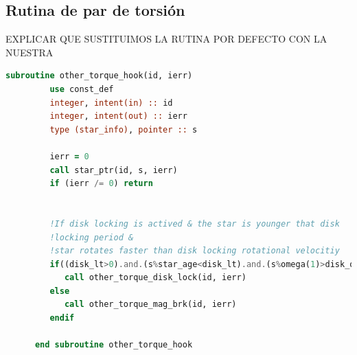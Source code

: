 \subsection{Rutina de par de torsión}
EXPLICAR QUE SUSTITUIMOS LA RUTINA POR DEFECTO CON LA NUESTRA
\begin{lstlisting}[language=Fortran, caption={Rutina de par de torsión.}, label={lst:torque_hook}]
      subroutine other_torque_hook(id, ierr)
         use const_def
         integer, intent(in) :: id
         integer, intent(out) :: ierr
         type (star_info), pointer :: s

         ierr = 0
         call star_ptr(id, s, ierr)
         if (ierr /= 0) return


         !If disk locking is actived & the star is younger that disk 
         !locking period &
         !star rotates faster than disk locking rotational velocitiy
         if((disk_lt>0).and.(s%star_age<disk_lt).and.(s%omega(1)>disk_omega)) then
            call other_torque_disk_lock(id, ierr)
         else
            call other_torque_mag_brk(id, ierr)
         endif
         
      end subroutine other_torque_hook
\end{lstlisting}

